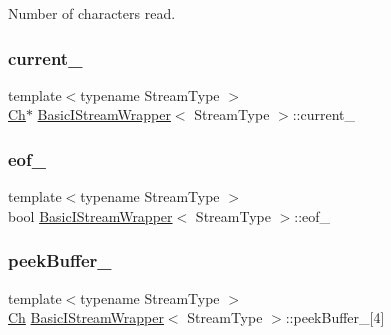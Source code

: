Number of characters read. 

\mbox{\label{classBasicIStreamWrapper_a7c7a177cfffd2793855d160cc0d427c0}} 
\subsubsection{\texorpdfstring{current\+\_\+}{current\_}}
{\footnotesize\ttfamily template$<$typename Stream\+Type $>$ \\
\hyperlink{classBasicIStreamWrapper_a88e4288ecdaa0d31ddf4e5917b9aa8d7}{Ch}$\ast$ \hyperlink{classBasicIStreamWrapper}{Basic\+I\+Stream\+Wrapper}$<$ Stream\+Type $>$\+::current\+\_\+\hspace{0.3cm}{\ttfamily [private]}}

\mbox{\label{classBasicIStreamWrapper_afc35bf604fac076468d3801f85604210}} 
\subsubsection{\texorpdfstring{eof\+\_\+}{eof\_}}
{\footnotesize\ttfamily template$<$typename Stream\+Type $>$ \\
bool \hyperlink{classBasicIStreamWrapper}{Basic\+I\+Stream\+Wrapper}$<$ Stream\+Type $>$\+::eof\+\_\+\hspace{0.3cm}{\ttfamily [private]}}

\mbox{\label{classBasicIStreamWrapper_ae85be0f5472085497a21a7e135aba09d}} 
\subsubsection{\texorpdfstring{peek\+Buffer\+\_\+}{peekBuffer\_}}
{\footnotesize\ttfamily template$<$typename Stream\+Type $>$ \\
\hyperlink{classBasicIStreamWrapper_a88e4288ecdaa0d31ddf4e5917b9aa8d7}{Ch} \hyperlink{classBasicIStreamWrapper}{Basic\+I\+Stream\+Wrapper}$<$ Stream\+Type $>$\+::peek\+Buffer\+\_\+\mbox{[}4\mbox{]}\hspace{0.3cm}{\ttfamily [private]}}

